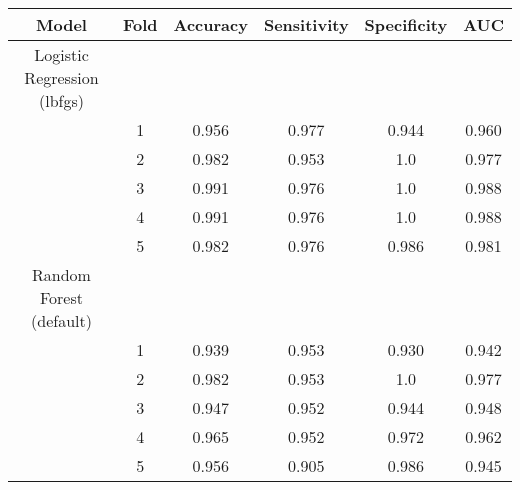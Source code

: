 \documentclass{labReport}
\begin{document}
\begin{table}[H]
    \centering
    \begin{tabular}{cccccc}
        \hline
        Model & Fold & Accuracy & Sensitivity & Specificity & AUC   \\ \hline
        Logistic Regression (lbfgs)                                 \\ \hline
              & 1    & 0.956    & 0.977       & 0.944       & 0.960 \\
              & 2    & 0.982    & 0.953       & 1.0         & 0.977 \\
              & 3    & 0.991    & 0.976       & 1.0         & 0.988 \\
              & 4    & 0.991    & 0.976       & 1.0         & 0.988 \\
              & 5    & 0.982    & 0.976       & 0.986       & 0.981 \\ \hline
        Random Forest (default)                                     \\ \hline
              & 1    & 0.939    & 0.953       & 0.930       & 0.942 \\
              & 2    & 0.982    & 0.953       & 1.0         & 0.977 \\
              & 3    & 0.947    & 0.952       & 0.944       & 0.948 \\
              & 4    & 0.965    & 0.952       & 0.972       & 0.962 \\
              & 5    & 0.956    & 0.905       & 0.986       & 0.945 \\
        \hline
    \end{tabular}
\end{table}
\end{document}
